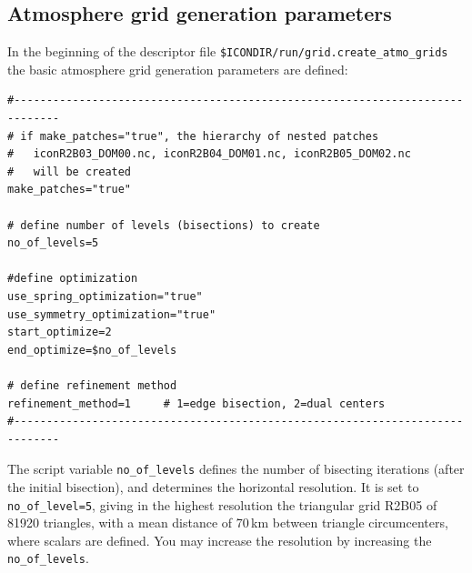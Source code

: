 \subsection{Atmosphere grid generation parameters}

In the beginning of the descriptor file \verb+$ICONDIR/run/grid.create_atmo_grids+ the basic atmosphere grid generation parameters are defined:

\begin{small}
  \begin{verbatim}
#-----------------------------------------------------------------------------
# if make_patches="true", the hierarchy of nested patches
#   iconR2B03_DOM00.nc, iconR2B04_DOM01.nc, iconR2B05_DOM02.nc
#   will be created
make_patches="true" 

# define number of levels (bisections) to create
no_of_levels=5

#define optimization
use_spring_optimization="true"          
use_symmetry_optimization="true" 
start_optimize=2
end_optimize=$no_of_levels

# define refinement method
refinement_method=1     # 1=edge bisection, 2=dual centers
#-----------------------------------------------------------------------------
  \end{verbatim}
\end{small}


The script variable \verb+no_of_levels+ defines the number of bisecting iterations (after the initial bisection), and determines the horizontal resolution. It is set to \verb+no_of_level=5+, giving in the highest resolution the triangular grid R2B05 of 81920 triangles, with a mean distance of 70\,km between triangle circumcenters, where scalars are defined. You may increase the resolution by increasing the \verb+no_of_levels+.

